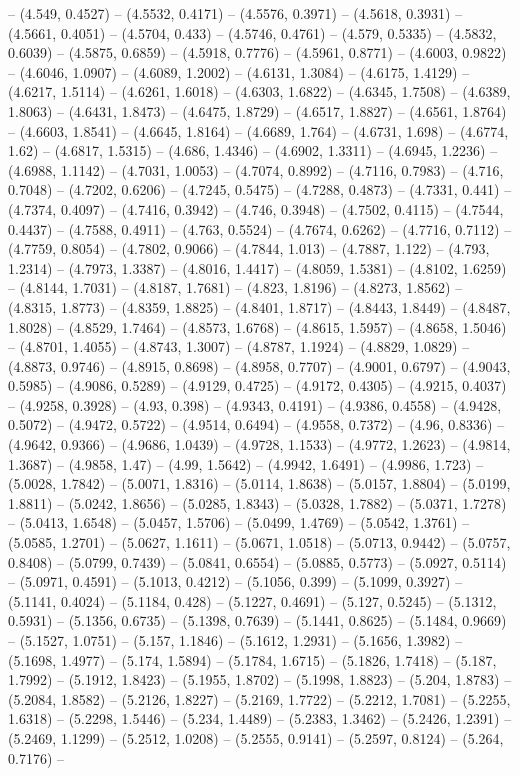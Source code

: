 -- (4.549, 0.4527) -- (4.5532, 0.4171) -- (4.5576, 0.3971) -- (4.5618, 0.3931) -- (4.5661, 0.4051) -- (4.5704, 0.433) -- (4.5746, 0.4761) -- (4.579, 0.5335) -- (4.5832, 0.6039) -- (4.5875, 0.6859) -- (4.5918, 0.7776) -- (4.5961, 0.8771) -- (4.6003, 0.9822) -- (4.6046, 1.0907) -- (4.6089, 1.2002) -- (4.6131, 1.3084) -- (4.6175, 1.4129) -- (4.6217, 1.5114) -- (4.6261, 1.6018) -- (4.6303, 1.6822) -- (4.6345, 1.7508) -- (4.6389, 1.8063) -- (4.6431, 1.8473) -- (4.6475, 1.8729) -- (4.6517, 1.8827) -- (4.6561, 1.8764) -- (4.6603, 1.8541) -- (4.6645, 1.8164) -- (4.6689, 1.764) -- (4.6731, 1.698) -- (4.6774, 1.62) -- (4.6817, 1.5315) -- (4.686, 1.4346) -- (4.6902, 1.3311) -- (4.6945, 1.2236) -- (4.6988, 1.1142) -- (4.7031, 1.0053) -- (4.7074, 0.8992) -- (4.7116, 0.7983) -- (4.716, 0.7048) -- (4.7202, 0.6206) -- (4.7245, 0.5475) -- (4.7288, 0.4873) -- (4.7331, 0.441) -- (4.7374, 0.4097) -- (4.7416, 0.3942) -- (4.746, 0.3948) -- (4.7502, 0.4115) -- (4.7544, 0.4437) -- (4.7588, 0.4911) -- (4.763, 0.5524) -- (4.7674, 0.6262) -- (4.7716, 0.7112) -- (4.7759, 0.8054) -- (4.7802, 0.9066) -- (4.7844, 1.013) -- (4.7887, 1.122) -- (4.793, 1.2314) -- (4.7973, 1.3387) -- (4.8016, 1.4417) -- (4.8059, 1.5381) -- (4.8102, 1.6259) -- (4.8144, 1.7031) -- (4.8187, 1.7681) -- (4.823, 1.8196) -- (4.8273, 1.8562) -- (4.8315, 1.8773) -- (4.8359, 1.8825) -- (4.8401, 1.8717) -- (4.8443, 1.8449) -- (4.8487, 1.8028) -- (4.8529, 1.7464) -- (4.8573, 1.6768) -- (4.8615, 1.5957) -- (4.8658, 1.5046) -- (4.8701, 1.4055) -- (4.8743, 1.3007) -- (4.8787, 1.1924) -- (4.8829, 1.0829) -- (4.8873, 0.9746) -- (4.8915, 0.8698) -- (4.8958, 0.7707) -- (4.9001, 0.6797) -- (4.9043, 0.5985) -- (4.9086, 0.5289) -- (4.9129, 0.4725) -- (4.9172, 0.4305) -- (4.9215, 0.4037) -- (4.9258, 0.3928) -- (4.93, 0.398) -- (4.9343, 0.4191) -- (4.9386, 0.4558) -- (4.9428, 0.5072) -- (4.9472, 0.5722) -- (4.9514, 0.6494) -- (4.9558, 0.7372) -- (4.96, 0.8336) -- (4.9642, 0.9366) -- (4.9686, 1.0439) -- (4.9728, 1.1533) -- (4.9772, 1.2623) -- (4.9814, 1.3687) -- (4.9858, 1.47) -- (4.99, 1.5642) -- (4.9942, 1.6491) -- (4.9986, 1.723) -- (5.0028, 1.7842) -- (5.0071, 1.8316) -- (5.0114, 1.8638) -- (5.0157, 1.8804) -- (5.0199, 1.8811) -- (5.0242, 1.8656) -- (5.0285, 1.8343) -- (5.0328, 1.7882) -- (5.0371, 1.7278) -- (5.0413, 1.6548) -- (5.0457, 1.5706) -- (5.0499, 1.4769) -- (5.0542, 1.3761) -- (5.0585, 1.2701) -- (5.0627, 1.1611) -- (5.0671, 1.0518) -- (5.0713, 0.9442) -- (5.0757, 0.8408) -- (5.0799, 0.7439) -- (5.0841, 0.6554) -- (5.0885, 0.5773) -- (5.0927, 0.5114) -- (5.0971, 0.4591) -- (5.1013, 0.4212) -- (5.1056, 0.399) -- (5.1099, 0.3927) -- (5.1141, 0.4024) -- (5.1184, 0.428) -- (5.1227, 0.4691) -- (5.127, 0.5245) -- (5.1312, 0.5931) -- (5.1356, 0.6735) -- (5.1398, 0.7639) -- (5.1441, 0.8625) -- (5.1484, 0.9669) -- (5.1527, 1.0751) -- (5.157, 1.1846) -- (5.1612, 1.2931) -- (5.1656, 1.3982) -- (5.1698, 1.4977) -- (5.174, 1.5894) -- (5.1784, 1.6715) -- (5.1826, 1.7418) -- (5.187, 1.7992) -- (5.1912, 1.8423) -- (5.1955, 1.8702) -- (5.1998, 1.8823) -- (5.204, 1.8783) -- (5.2084, 1.8582) -- (5.2126, 1.8227) -- (5.2169, 1.7722) -- (5.2212, 1.7081) -- (5.2255, 1.6318) -- (5.2298, 1.5446) -- (5.234, 1.4489) -- (5.2383, 1.3462) -- (5.2426, 1.2391) -- (5.2469, 1.1299) -- (5.2512, 1.0208) -- (5.2555, 0.9141) -- (5.2597, 0.8124) -- (5.264, 0.7176) -- 